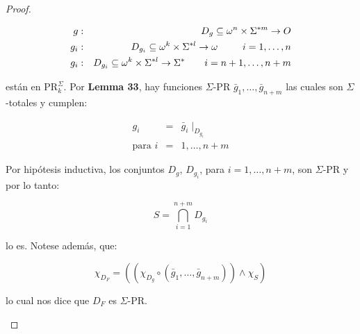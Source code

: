 \begin{proof}
\begin{enumerate}
        \begin{eqnarray*}
          g &:& D_{g} \subseteq \omega^{n} \times \Sigma^{\ast m} \rightarrow O \\
          g_{i} &:& D_{g_{i}} \subseteq \omega^{k} \times \Sigma^{\ast l} \rightarrow \omega \qquad \;\; i = 1, \dotsc,
            n \\
          g_{i} &:& D_{g_{i}} \subseteq \omega^{k} \times \Sigma^{\ast l} \rightarrow \Sigma^{\ast} \qquad i = n + 1, \dotsc,
            n + m
        \end{eqnarray*}

        \PN están en $\mathrm{PR}_{k}^{\Sigma}$. Por \textbf{Lemma 33}, hay funciones $\Sigma$-PR $\bar{g}_{1}, \dotsc,
        \bar{g}_{n+m}$ las cuales son $\Sigma$-totales y cumplen:

        \begin{eqnarray*}
          g_{i} &=& \bar{g}_{i} \mid_{D_{g_{i}}} \\
          \text{para } i &=& 1, \dotsc, n + m
        \end{eqnarray*}

        \PN Por hipótesis inductiva, los conjuntos $D_{g}$, $D_{g_{i}}$, para $i = 1, \dotsc, n + m$, son $\Sigma$-PR y
        por lo tanto:

        \[
          S = \bigcap_{i=1}^{n+m} D_{g_{i}}
        \]

        \PN lo es. Notese además, que:

        \[
          \chi_{D_{F}} = \left((\chi_{D_{g}} \circ (\bar{g}_{1}, \dotsc, \bar{g}_{n+m})) \wedge \chi_{S}\right)
        \]

        \PN lo cual nos dice que $D_{F}$ es $\Sigma$-PR.
    \end{enumerate}
  \end{proof}
